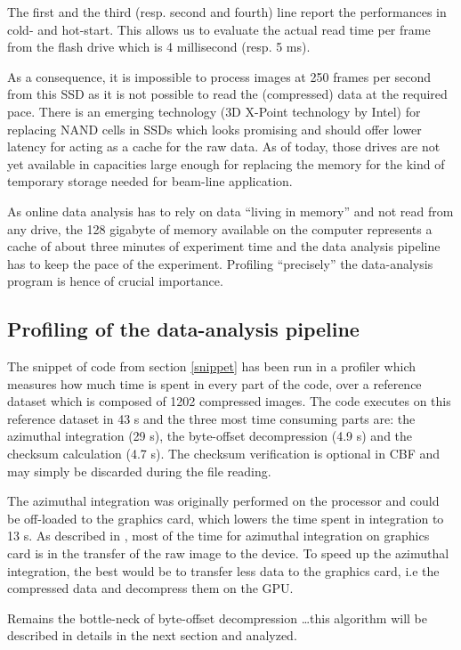 \documentclass[preprint]{iucr}              %
\begin{document}
The first and the third (resp. second and fourth) line report the performances
in cold- and hot-start.
This allows us to evaluate the actual read time per frame from the flash
drive which is 4 millisecond (resp. 5 ms).

As a consequence, it is impossible to process images at 250 frames per
second from this SSD as it is not possible to read the (compressed) data
at the required pace.
There is an emerging technology (3D X-Point technology by Intel) for replacing
NAND cells in SSDs which looks promising and should offer
lower latency for acting as a cache for the raw data. 
As of today, those drives are not yet available in capacities large
enough for replacing the memory for the kind of temporary storage needed for
beam-line application.

As online data analysis has to rely on data ``living in memory'' and not
read from any drive, the 128 gigabyte of memory available on the computer
represents a cache of about three minutes of experiment time and the data
analysis pipeline has to keep the pace of the experiment. 
Profiling ``precisely'' the data-analysis program is hence of crucial
importance.

\subsection{Profiling of the data-analysis pipeline}

The snippet of code from section \ref{snippet} has been run in a profiler which
measures how much time is spent in every part of the code, over a reference
dataset which is composed of 1202 compressed images.
The code executes on this reference dataset in 43 s and the
three most time consuming parts are: the azimuthal integration (29 s), the
byte-offset decompression (4.9 s) and the checksum calculation (4.7 s).
The checksum verification is optional in CBF and may simply be discarded
during the file reading.

The azimuthal integration was originally performed on the processor and could be
off-loaded to the graphics card, which lowers the time spent in integration to 
13 s.
As described in \cite{kieffer_ashiotis-proc-euroscipy-2014}, most of the time
for azimuthal integration on graphics card is in the transfer of the raw image
to the device.
To speed up the azimuthal integration, the best would be to transfer less data
to the graphics card, i.e the compressed data and decompress them on the GPU.

Remains the bottle-neck of byte-offset decompression \ldots this algorithm will
be described in details in the next section and analyzed. 
\end{document}
